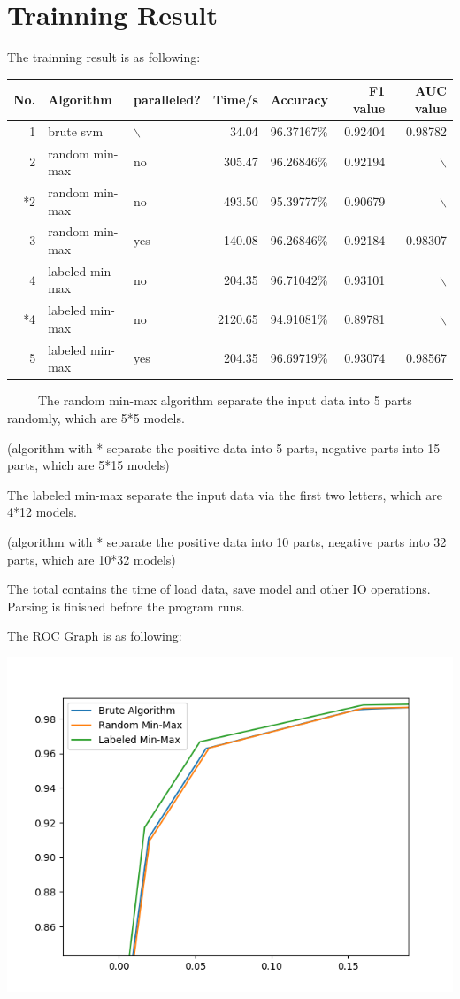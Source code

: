 \documentclass[11pt]{article}
\begin{document}
\section{Trainning Result}
\label{sec-5}
The trainning result is as following:
\begin{center}
\begin{tabular}{rllrlrr}
\hline
No. & Algorithm & paralleled? & Time/s & Accuracy & F1 value & AUC value\\
\hline
1 & brute svm & $\backslash$ & 34.04 & 96.37167\% & 0.92404 & 0.98782\\
2 & random min-max & no & 305.47 & 96.26846\% & 0.92194 & $\backslash$\\
*2 & random min-max & no & 493.50 & 95.39777\% & 0.90679 & $\backslash$\\
3 & random min-max & yes & 140.08 & 96.26846\% & 0.92184 & 0.98307\\
4 & labeled min-max & no & 204.35 & 96.71042\% & 0.93101 & $\backslash$\\
*4 & labeled min-max & no & 2120.65 & 94.91081\% & 0.89781 & $\backslash$\\
5 & labeled min-max & yes & 204.35 & 96.69719\% & 0.93074 & 0.98567\\
\hline
\end{tabular}
\end{center}
\ \ \ \ \ The random min-max algorithm separate the input data into 5 parts randomly, which are 5*5 models.

(algorithm with * separate the positive data into 5 parts, negative parts into 15 parts, which are 5*15 models)

The labeled min-max separate the input data via the first two letters, which are 4*12 models.

(algorithm with * separate the positive data into 10 parts, negative parts into 32 parts, which are 10*32 models)

The total contains the time of load data, save model and other IO operations.
Parsing is finished before the program runs.

The ROC Graph is as following:


\includegraphics[width=.9\linewidth]{figure_1.png}
\end{document}
